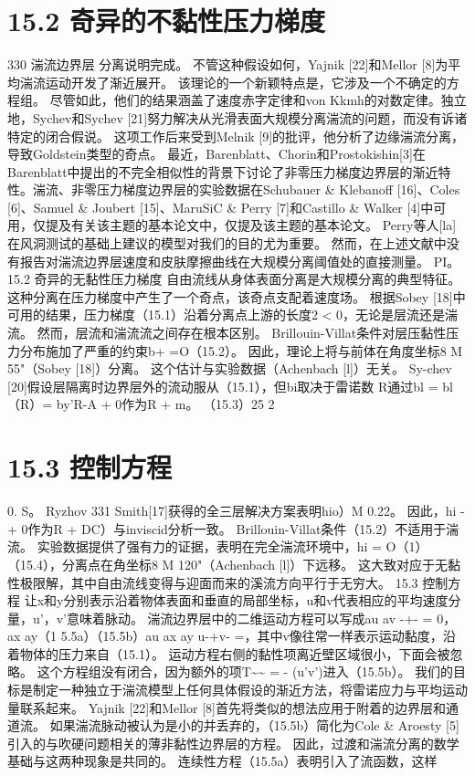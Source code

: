 \documentclass[UTF8,11pt,a4paper,openany,fontset=fandol]{ctexbook}
\begin{document}
\section{15.2 奇异的不黏性压力梯度}
330 湍流边界层 分离说明完成。 不管这种假设如何，Yajnik [22]和Mellor [8]为平均湍流运动开发了渐近展开。 该理论的一个新颖特点是，它涉及一个不确定的方程组。 尽管如此，他们的结果涵盖了速度赤字定律和von Kkmh的对数定律。独立地，Sychev和Sychev [21]努力解决从光滑表面大规模分离湍流的问题，而没有诉诸特定的闭合假说。 这项工作后来受到Melnik [9]的批评，他分析了边缘湍流分离，导致Goldstein类型的奇点。 最近，Barenblatt、Chorin和Prostokishin[3]在Barenblatt中提出的不完全相似性的背景下讨论了非零压力梯度边界层的渐近特性。湍流、非零压力梯度边界层的实验数据在Schubauer \& Klebanoff [16]、Coles [6]、Samuel \& Joubert [15]、MaruSiC \& Perry [7]和Castillo \& Walker [4]中可用，仅提及有关该主题的基本论文中，仅提及该主题的基本论文。 Perry等人[la]在风洞测试的基础上建议的模型对我们的目的尤为重要。 然而，在上述文献中没有报告对湍流边界层速度和皮肤摩擦曲线在大规模分离阈值处的直接测量。 PI。 15.2 奇异的无黏性压力梯度 自由流线从身体表面分离是大规模分离的典型特征。 这种分离在压力梯度中产生了一个奇点，该奇点支配着速度场。 根据Sobey [18]中可用的结果，压力梯度（15.1）沿着分离点上游的长度2 < 0，无论是层流还是湍流。 然而，层流和湍流流之间存在根本区别。 Brillouin-Villat条件对层压黏性压力分布施加了严重的约束b+ =O（15.2）。 因此，理论上将与前体在角度坐标8 M 55"（Sobey [18]）分离。 这个估计与实验数据（Achenbach [l]）无关。 Sy-chev [20]假设层隔离时边界层外的流动服从（15.1），但bi取决于雷诺数 R通过bl = bl（R）= by'R-A + 0作为R + m。 （15.3）25 2

\section{15.3 控制方程}
0. S。 Ryzhov 331 Smith[17]获得的全三层解决方案表明hio）M 0.22。 因此，hi -+ 0作为R + DC）与inviscid分析一致。 Brillouin-Villat条件（15.2）不适用于湍流。 实验数据提供了强有力的证据，表明在完全湍流环境中，hi = O（1）（15.4），分离点在角坐标8 M 120"（Achenbach [l]）下远移。 这大致对应于无黏性极限解，其中自由流线变得与迎面而来的溪流方向平行于无穷大。 15.3 控制方程 让x和y分别表示沿着物体表面和垂直的局部坐标，u和v代表相应的平均速度分量，u'，v'意味着脉动。 湍流边界层中的二维运动方程可以写成au av -+- = 0，ax ay（1 5.5a）（15.5b）au ax ay u-+v- =，其中v像往常一样表示运动黏度，沿着物体的压力来自（15.1）。 运动方程右侧的黏性项离近壁区域很小，下面会被忽略。 这个方程组没有闭合，因为额外的项T\textasciitilde{}\textasciitilde{} = - (u'v')进入（15.5b）。 我们的目标是制定一种独立于湍流模型上任何具体假设的渐近方法，将雷诺应力与平均运动量联系起来。 Yajnik [22]和Mellor [8]首先将类似的想法应用于附着的边界层和通道流。 如果湍流脉动被认为是小的并丢弃的，（15.5b）简化为Cole \& Aroesty [5]引入的与吹硬问题相关的薄非黏性边界层的方程。 因此，过渡和湍流分离的数学基础与这两种现象是共同的。 连续性方程（15.5a）表明引入了流函数，这样
\end{document}

